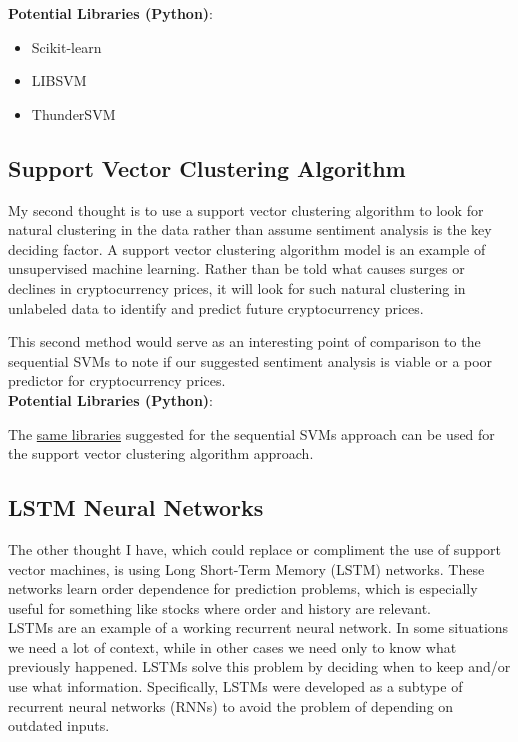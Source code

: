 \documentclass{article}
\begin{document}
\textbf{Potential Libraries (Python)}:

\begin{itemize}
    \item Scikit-learn
    \item LIBSVM
    \item ThunderSVM
\end{itemize}


\subsection{Support Vector Clustering Algorithm}
\label{sec:SVMclustering}

My second thought is to use a support vector clustering algorithm to look for natural clustering in the data rather than assume sentiment analysis is the key deciding factor. A support vector clustering algorithm model is an example of unsupervised machine learning. Rather than be told what causes surges or declines in cryptocurrency prices, it will look for such natural clustering in unlabeled data to identify and predict future cryptocurrency prices.

This second method would serve as an interesting point of comparison to the sequential SVMs to note if our suggested sentiment analysis is viable or a poor predictor for cryptocurrency prices. \\

\textbf{Potential Libraries (Python)}:

The \hyperref[sec:sequentialSVMlibraries]{same libraries} suggested for the sequential SVMs approach can be used for the support vector clustering algorithm approach.


\subsection{LSTM Neural Networks}
\label{sec:LSTM}

The other thought I have, which could replace or compliment the use of support vector machines, is using Long Short-Term Memory (LSTM) networks. These networks learn order dependence for prediction problems, which is especially useful for something like stocks where order and history are relevant. \\

LSTMs are an example of a working recurrent neural network. In some situations we need a lot of context, while in other cases we need only to know what previously happened. LSTMs solve this problem by deciding when to keep and/or use what information. Specifically, LSTMs were developed as a subtype of recurrent neural networks (RNNs) to avoid the problem of depending on outdated inputs. \\
\end{document}
